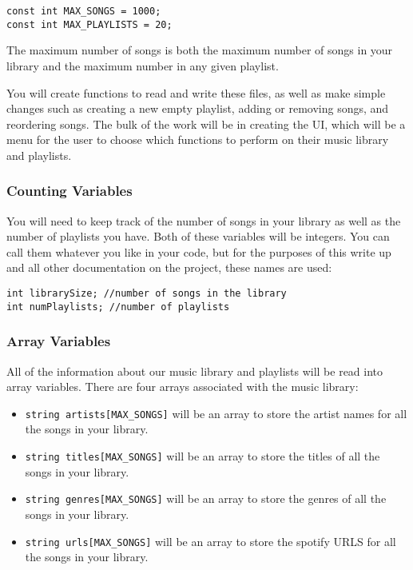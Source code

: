 \begin{verbatim}
const int MAX_SONGS = 1000;
const int MAX_PLAYLISTS = 20;
\end{verbatim}

The maximum number of songs is both the maximum number of songs in your library and the maximum number in any given playlist. 

You will create functions to read and write these files, as well as make simple changes such as creating a new empty playlist, adding or removing songs, and reordering songs. The bulk of the work will be in creating the UI, which will be a menu for the user to choose which functions to perform on their music library and playlists. 

\subsubsection{Counting Variables}
You will need to keep track of the number of songs in your library as well as the number of playlists you have. Both of these variables will be integers. You can call them whatever you like in your code, but for the purposes of this write up and all other documentation on the project, these names are used:

\begin{verbatim}
int librarySize; //number of songs in the library
int numPlaylists; //number of playlists
\end{verbatim}

\subsubsection{Array Variables}
All of the information about our music library and playlists will be read into array variables. There are four arrays associated with the music library:

\begin{itemize}
    \item \texttt{string artists[MAX_SONGS]} will be an array to store the artist names for all the songs in your library. 
    \item \texttt{string titles[MAX_SONGS]} will be an array to store the titles of all the songs in your library.
    \item \texttt{string genres[MAX_SONGS]} will be an array to store the genres of all the songs in your library.
    \item \texttt{string urls[MAX_SONGS]} will be an array to store the spotify URLS for all the songs in your library.
\end{itemize}

